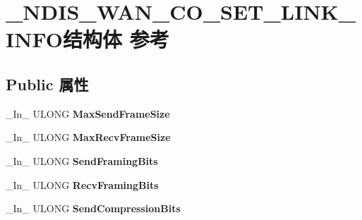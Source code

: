 \hypertarget{struct___n_d_i_s___w_a_n___c_o___s_e_t___l_i_n_k___i_n_f_o}{}\section{\+\_\+\+N\+D\+I\+S\+\_\+\+W\+A\+N\+\_\+\+C\+O\+\_\+\+S\+E\+T\+\_\+\+L\+I\+N\+K\+\_\+\+I\+N\+F\+O结构体 参考}
\label{struct___n_d_i_s___w_a_n___c_o___s_e_t___l_i_n_k___i_n_f_o}
\subsection*{Public 属性}
\begin{DoxyCompactItemize}
\item 
\mbox{\label{struct___n_d_i_s___w_a_n___c_o___s_e_t___l_i_n_k___i_n_f_o_a80bd26a70af98be880615846ccf897b1}} 
\+\_\+\+In\+\_\+ U\+L\+O\+NG {\bfseries Max\+Send\+Frame\+Size}
\item 
\mbox{\label{struct___n_d_i_s___w_a_n___c_o___s_e_t___l_i_n_k___i_n_f_o_a01383eddc2090502839f5a38c2dbf8d1}} 
\+\_\+\+In\+\_\+ U\+L\+O\+NG {\bfseries Max\+Recv\+Frame\+Size}
\item 
\mbox{\label{struct___n_d_i_s___w_a_n___c_o___s_e_t___l_i_n_k___i_n_f_o_ac47630621df8b024f3cf1a1ac36a44f4}} 
\+\_\+\+In\+\_\+ U\+L\+O\+NG {\bfseries Send\+Framing\+Bits}
\item 
\mbox{\label{struct___n_d_i_s___w_a_n___c_o___s_e_t___l_i_n_k___i_n_f_o_a1e6a83890d7e735115d8116fcf9962c4}} 
\+\_\+\+In\+\_\+ U\+L\+O\+NG {\bfseries Recv\+Framing\+Bits}
\item 
\mbox{\label{struct___n_d_i_s___w_a_n___c_o___s_e_t___l_i_n_k___i_n_f_o_ab3371f9b2dded717e36e2b1fdbe222a6}} 
\+\_\+\+In\+\_\+ U\+L\+O\+NG {\bfseries Send\+Compression\+Bits}
\item 
\mbox{\label{struct___n_d_i_s___w_a_n___c_o___s_e_t___l_i_n_k___i_n_f_o_a0d8d0aefa3c6ba0aab65956a58e992f8}} 

\end{DoxyCompactItemize}
